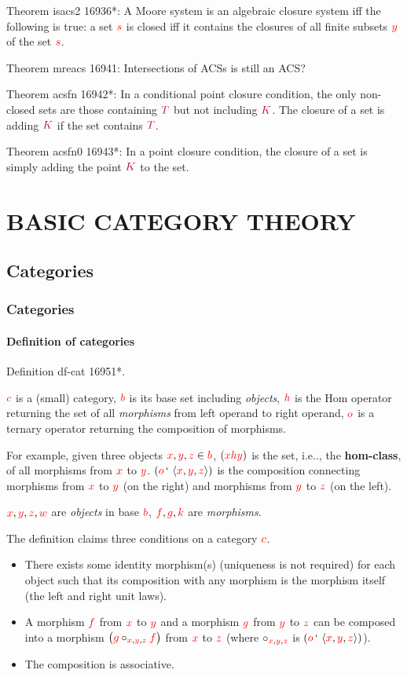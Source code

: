 \documentclass[12pt, letterpaper]{article}
\makeatletter
\newcommand\ie{i.e\@ifnextchar.{}{.\@}}
\newcommand{\red}[1]{{\color{red} #1}}
\newcommand{\purple}[1]{{\color{purple} #1}}
\newcommand{\setvar}{\red}
\newcommand{\classvar}{\purple}
\newcommand{\sbb}{\setvar{b}}
\newcommand{\scc}{\setvar{c}}
\newcommand{\sff}{\setvar{f}}
\newcommand{\sg}{\setvar{g}}
\newcommand{\sh}{\setvar{h}}
\newcommand{\sk}{\setvar{k}}
\newcommand{\so}{\setvar{o}}
\newcommand{\sw}{\setvar{w}}
\newcommand{\sx}{\setvar{x}}
\newcommand{\sy}{\setvar{y}}
\newcommand{\sz}{\setvar{z}}
\newcommand{\clK}{\classvar{K}}
\newcommand{\clT}{\classvar{T}}
\newcommand{\at}{\,`\,}
\newcommand{\otri}[3]{\left\langle{{#1},{#2},{#3}}\right\rangle}
\theoremstyle{definition}
\theoremstyle{remark}
\theoremstyle{definition}
\theoremstyle{plain}
\makeatother
\begin{document}
	Theorem	isacs2 16936*: A Moore system is an algebraic closure system iff the following is true: a set $\setvar{s}$ is closed iff it contains the closures of all finite subsets $\sy$ of the set $\setvar{s}$.
		
	Theorem	mreacs 16941: Intersections of ACSs is still an ACS?
	
	Theorem	acsfn 16942*: In a conditional point closure condition, the only non-closed sets are those containing $\clT$ but not including $\clK$. The closure of a set is adding $\clK$ if the set contains $\clT$.
	
	Theorem	acsfn0 16943*: In a point closure condition, the closure of a set is simply adding the point $\clK$ to the set.
	
	\section{BASIC CATEGORY THEORY}
	\subsection{Categories}
	\subsubsection{Categories}
	
	\paragraph{Definition of categories}
	Definition	df-cat 16951*.
	
	$\scc$ is a (small) category, $\sbb$ is its base set including \textit{objects}, $\sh$ is the Hom operator returning the set of all \textit{morphisms} from left operand to right operand, $\so$ is a ternary operator returning the composition of morphisms.
	
	For example, given three objects $\sx,\sy,\sz\in\sbb$, $(\sx\sh\sy)$ is the set, \ie, the \textbf{hom-class}, of all morphisms from $\sx$ to $\sy$. $(\so\at\otri{\sx}{\sy}{\sz})$ is the composition connecting morphisms from $\sx$ to $\sy$ (on the right) and morphisms from $\sy$ to $\sz$ (on the left).
	
	$\sx,\sy,\sz,\sw$ are \textit{objects} in base $\sbb$, $\sff,\sg,\sk$ are \textit{morphisms}.
	
	The definition claims three conditions on a category $\scc$.
	
	\begin{itemize}
		\item There exists some identity morphism(s) (uniqueness is not required) for each object such that its composition with any morphism is the morphism itself (the left and right unit laws).
		
		\item A morphism $\sff$ from $\sx$ to $\sy$ and a morphism $\sg$ from $\sy$ to $\sz$ can be composed into a morphism $\big(\sg\circ_{\sx,\sy,\sz}\sff\big)$ from $\sx$ to $\sz$ (where $\circ_{\sx,\sy,\sz}$ is $(\so\at\otri{\sx}{\sy}{\sz})$).
		
		\item The composition is associative.
	\end{itemize}
\end{document}
